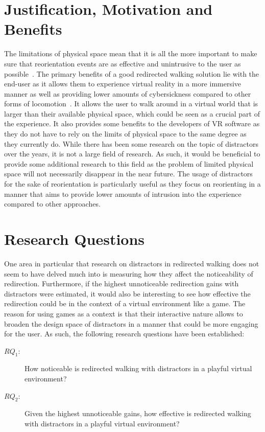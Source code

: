 \section{Justification, Motivation and Benefits}
The limitations of physical space mean that it is all the more important to make sure that reorientation events are as effective and unintrusive to the user as possible~\cite{azmandian2015physical}. The primary benefits of a good redirected walking solution lie with the end-user as it allows them to experience virtual reality in a more immersive manner as well as providing lower amounts of cybersickness compared to other forms of locomotion~\cite{razzaque2001redirected, peck2011evaluation}. It allows the user to walk around in a virtual world that is larger than their available physical space, which could be seen as a crucial part of the experience. It also provides some benefits to the developers of VR software as they do not have to rely on the limits of physical space to the same degree as they currently do. While there has been some research on the topic of distractors over the years, it is not a large field of research. As such, it would be beneficial to provide some additional research to this field as the problem of limited physical space will not necessarily disappear in the near future. The usage of distractors for the sake of reorientation is particularly useful as they focus on reorienting in a manner that aims to provide lower amounts of intrusion into the experience compared to other approaches.

\section{Research Questions}\label{research:questions}
One area in particular that research on distractors in redirected walking does not seem to have delved much into is measuring how they affect the noticeability of redirection. Furthermore, if the highest unnoticeable redirection gains with distractors were estimated, it would also be interesting to see how effective the redirection could be in the context of a virtual environment like a game. The reason for using games as a context is that their interactive nature allows to broaden the design space of distractors in a manner that could be more engaging for the user. As such, the following research questions have been established:
\begin{description}
\item[$RQ_1$: ] How noticeable is redirected walking with distractors in a playful virtual environment?
\item[$RQ_2$: ] Given the highest unnoticeable gains, how effective is redirected walking with distractors in a playful virtual environment?
\end{description}

